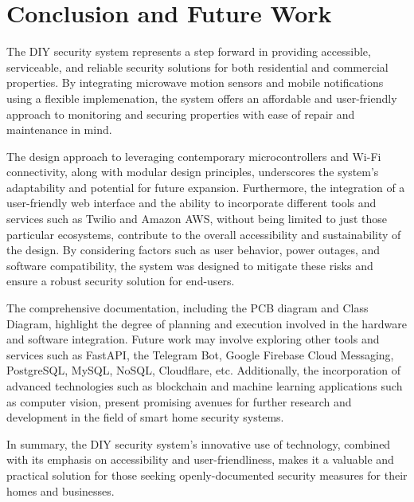 \section{Conclusion and Future Work}\label{sec:conclusion-and-future-work}

The \brand{} DIY security system represents a step forward in providing
accessible, serviceable, and reliable security solutions for both residential and commercial
properties. By integrating microwave motion sensors and mobile notifications using a flexible
implemenation, the system offers an affordable and user-friendly approach to monitoring and
securing properties with ease of repair and maintenance in mind.

The design approach to leveraging contemporary microcontrollers and Wi-Fi connectivity, along
with modular design principles, underscores the system's adaptability and potential for
future expansion. Furthermore, the integration of a user-friendly web interface and the ability
to incorporate different tools and services such as Twilio and Amazon AWS, without being
limited to just those particular ecosystems, contribute to the overall accessibility and
sustainability of the design. By considering factors such as user behavior, power outages, and
software compatibility, the system was designed to mitigate these risks and ensure a robust
security solution for end-users.

The comprehensive documentation, including the PCB diagram and Class Diagram, highlight the
degree of planning and execution involved in the hardware and software integration. Future
work may involve exploring other tools and services such as FastAPI, the Telegram Bot, Google
Firebase Cloud Messaging, PostgreSQL, MySQL, NoSQL, Cloudflare, etc. Additionally, the
incorporation of advanced technologies such as blockchain and machine learning applications
such as computer vision, present promising avenues for further research and development in the
field of smart home security systems.

In summary, the \brand{} DIY security system's innovative use of technology, combined with
its emphasis on accessibility and user-friendliness, makes it a valuable and practical
solution for those seeking openly-documented security measures for their homes and businesses.
